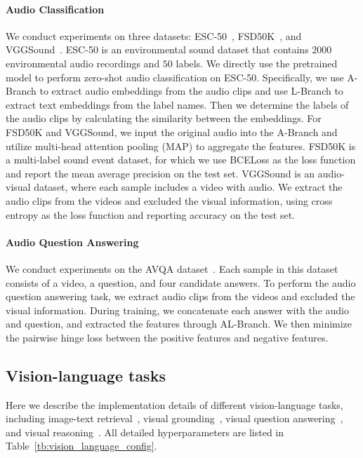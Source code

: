 \paragraph{Audio Classification}
We conduct experiments on three datasets: ESC-50~\cite{esc50}, FSD50K~\cite{fsd50k}, and VGGSound~\cite{vggsound}. 
ESC-50 is an environmental sound dataset that contains $2000$ environmental audio recordings and $50$ labels. 
We directly use the pretrained \onepeace model to perform zero-shot audio classification on ESC-50. Specifically, we use A-Branch to extract audio embeddings from the audio clips and use L-Branch to extract text embeddings from the label names. Then we determine the labels of the audio clips by calculating the similarity between the embeddings.
For FSD50K and VGGSound, we input the original audio into the A-Branch and utilize multi-head attention pooling (MAP) to aggregate the features. 
FSD50K is a multi-label sound event dataset, for which we use BCELoss as the loss function and report the mean average precision on the test set.
VGGSound is an audio-visual dataset, where each sample includes a video with audio.
We extract the audio clips from the videos and excluded the visual information, using cross entropy as the loss function and reporting accuracy on the test set.

\paragraph{Audio Question Answering}
We conduct experiments on the AVQA dataset~\cite{avqa}. 
Each sample in this dataset consists of a video, a question, and four candidate answers. 
To perform the audio question answering task, we extract audio clips from the videos and excluded the visual information. 
During training, we concatenate each answer with the audio and question, and extracted the features through AL-Branch. 
We then minimize the pairwise hinge loss between the positive features and negative features.


\subsection{Vision-language tasks}
\label{app:vision_language_details}
Here we describe the implementation details of different vision-language tasks, including image-text retrieval~\cite{flickr,mscoco}, visual grounding~\cite{refcoco,refcocog}, visual question answering~\cite{vqa}, and visual reasoning~\cite{nlvr2}.
All detailed hyperparameters are listed in Table~\ref{tb:vision_language_config}.

